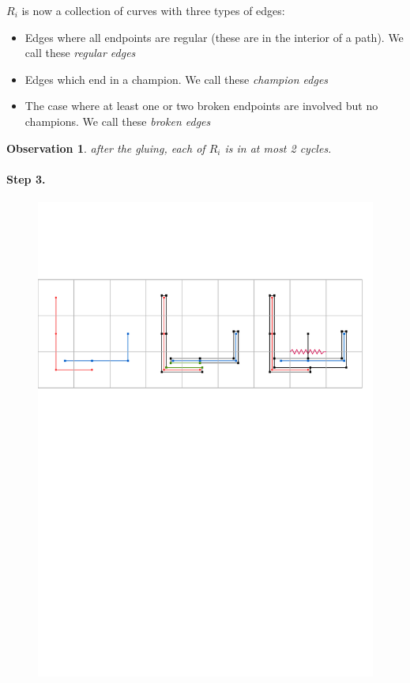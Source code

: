\documentclass[a4paper, UKenglish]{lipics-v2018}
\newtheorem{observation}{Observation}
\begin{document}
$R_i$ is now a collection of curves with three types of edges:

\begin{itemize}
\item Edges where all endpoints are regular (these are in the interior of a path). We call these \emph{regular edges}
\item Edges which end in a champion. We call these \emph{champion edges}
\item The case where at least one or two broken endpoints are involved but no champions. We call these \emph{broken edges}
\end{itemize}


\begin{observation}
after the gluing, each of $R_i$ is in at most 2 cycles.
\end{observation}
\paragraph*{Step 3.}

\begin{figure}[H]
\centering
\includegraphics[page = 2]{Figures/cycle.pdf}
\caption{ }
\label{fig:cycle2}
\end{figure}
\end{document}
